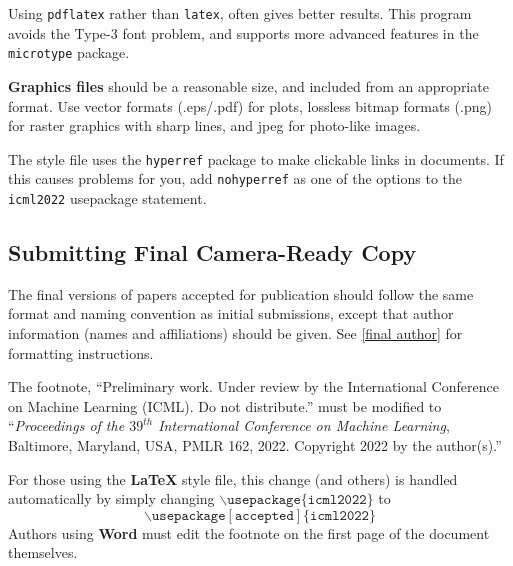 Using \texttt{pdflatex} rather than \texttt{latex}, often gives better
results. This program avoids the Type-3 font problem, and supports more
advanced features in the \texttt{microtype} package.

\textbf{Graphics files} should be a reasonable size, and included from
an appropriate format. Use vector formats (.eps/.pdf) for plots,
lossless bitmap formats (.png) for raster graphics with sharp lines, and
jpeg for photo-like images.

The style file uses the \texttt{hyperref} package to make clickable
links in documents. If this causes problems for you, add
\texttt{nohyperref} as one of the options to the \texttt{icml2022}
usepackage statement.


\subsection{Submitting Final Camera-Ready Copy}

The final versions of papers accepted for publication should follow the
same format and naming convention as initial submissions, except that
author information (names and affiliations) should be given. See
\cref{final author} for formatting instructions.

The footnote, ``Preliminary work. Under review by the International
Conference on Machine Learning (ICML). Do not distribute.'' must be
modified to ``\textit{Proceedings of the
$\mathit{39}^{th}$ International Conference on Machine Learning},
Baltimore, Maryland, USA, PMLR 162, 2022.
Copyright 2022 by the author(s).''

For those using the \textbf{\LaTeX} style file, this change (and others) is
handled automatically by simply changing
$\mathtt{\backslash usepackage\{icml2022\}}$ to
$$\mathtt{\backslash usepackage[accepted]\{icml2022\}}$$
Authors using \textbf{Word} must edit the
footnote on the first page of the document themselves.
